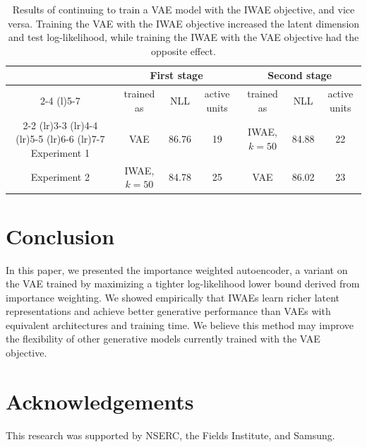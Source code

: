 \documentclass{article} %
\newcommand{\numSamples}{k}
\begin{document}
\begin{table}%
\vspace{-0.3in}
\begin{center}
\begin{tabular}{@{}c ccc ccc@{}}
& \multicolumn{3}{c}{First stage} & \multicolumn{3}{c}{Second stage} \\
\cmidrule(r){2-4} \cmidrule(l){5-7} 
& trained as   & NLL   & active units & trained as             & NLL   & active units \\ 
\cmidrule(lr){2-2} \cmidrule(lr){3-3} \cmidrule(lr){4-4} \cmidrule(lr){5-5} \cmidrule(lr){6-6} \cmidrule(lr){7-7} \midrule
Experiment 1 & VAE          & 86.76 & 19           & IWAE, $\numSamples=50$           & 84.88 & 22           \\ \midrule
Experiment 2 & IWAE, $\numSamples=50$ & 84.78 & 25           & VAE                    & 86.02 & 23           \\
\bottomrule
\end{tabular}
\end{center}
\vspace{-0.1in}
\caption{\small Results of continuing to train a VAE model with the IWAE objective, and vice versa. Training the VAE with the IWAE objective increased the latent dimension and test log-likelihood, while training the IWAE with the VAE objective had the opposite effect.}
\label{tbl:optima}
\end{table}

\section{Conclusion}
\label{sec:conclusion}

In this paper, we presented the importance weighted autoencoder, a variant on the VAE trained by maximizing a tighter log-likelihood lower bound derived from importance weighting. We showed empirically that IWAEs learn richer latent representations and achieve better generative performance than VAEs with equivalent architectures and training time. We believe this method may improve the flexibility of other generative models currently trained with the VAE objective.

\section{Acknowledgements}
This research was supported by NSERC, the Fields Institute, 
and Samsung. %
\end{document}
